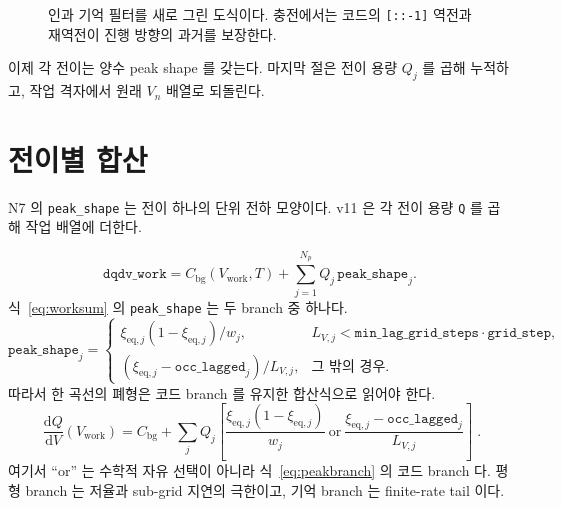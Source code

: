 \documentclass[11pt,a4paper]{article}
\newcommand{\dd}{\mathrm{d}}
\newcommand{\bg}{\mathrm{bg}}
\newcommand{\eq}{\mathrm{eq}}
\newcommand{\work}{\mathrm{work}}
\begin{document}
\begin{figure}[t]
\centering
{}
\caption{인과 기억 필터를 새로 그린 도식이다. 충전에서는 코드의 \texttt{[::-1]} 역전과 재역전이 진행 방향의 과거를 보장한다.}
\label{fig:lowpass}
\end{figure}

이제 각 전이는 양수 peak shape 를 갖는다. 마지막 절은 전이 용량 $Q_j$ 를 곱해 누적하고, 작업 격자에서 원래 $V_n$ 배열로 되돌린다.

\section{전이별 합산}\label{sec:n8}
N7 의 \texttt{peak\_shape} 는 전이 하나의 단위 전하 모양이다. v11 은 각 전이 용량 \texttt{Q} 를 곱해 작업 배열에 더한다.

\begin{equation}
\texttt{dqdv\_work}
=C_{\bg}(V_{\work},T)+
\sum_{j=1}^{N_p}Q_j\,\texttt{peak\_shape}_j.
\label{eq:worksum}
\end{equation}
식~\eqref{eq:worksum} 의 \texttt{peak\_shape} 는 두 branch 중 하나다.
\begin{equation}
\texttt{peak\_shape}_j=
\begin{cases}
\xi_{\eq,j}(1-\xi_{\eq,j})/w_j,&
L_{V,j}<\texttt{min\_lag\_grid\_steps}\cdot\texttt{grid\_step},\\[5pt]
(\xi_{\eq,j}-\texttt{occ\_lagged}_j)/L_{V,j},&
\text{그 밖의 경우}.
\end{cases}
\label{eq:peakbranch}
\end{equation}
따라서 한 곡선의 폐형은 코드 branch 를 유지한 합산식으로 읽어야 한다.
\begin{equation}
\boxed{\;\frac{\dd Q}{\dd V}(V_{\work})=
C_{\bg}+\sum_j Q_j
\left[
\frac{\xi_{\eq,j}(1-\xi_{\eq,j})}{w_j}
\ \text{or}\
\frac{\xi_{\eq,j}-\texttt{occ\_lagged}_j}{L_{V,j}}
\right]\;.}
\label{eq:closedcode}
\end{equation}
여기서 ``or'' 는 수학적 자유 선택이 아니라 식~\eqref{eq:peakbranch} 의 코드 branch 다. 평형 branch 는 저율과 sub-grid 지연의 극한이고, 기억 branch 는 finite-rate tail 이다.
\end{document}

